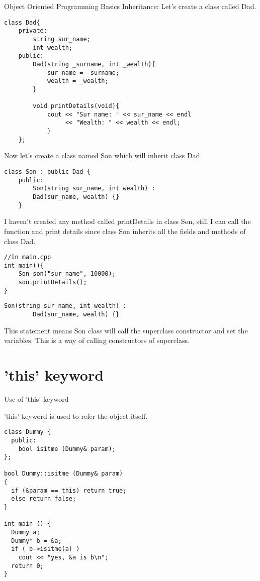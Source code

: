 \documentclass[newPxFont]{beamer}
\begin{document}
\begin{frame}{Object Oriented Programming Basics}
\alert{Inheritance:}
Let's create a class called Dad.

\begin{verbatim}
class Dad{
    private:
        string sur_name;
        int wealth;
    public:
        Dad(string _surname, int _wealth){
            sur_name = _surname;
            wealth = _wealth;
        }
        
        void printDetails(void){
            cout << "Sur name: " << sur_name << endl
                 << "Wealth: " << wealth << endl;
            }
    };
\end{verbatim}

Now let's create a class named Son which will inherit class Dad

\begin{verbatim}
class Son : public Dad {
    public:
        Son(string sur_name, int wealth) :
        Dad(sur_name, wealth) {}
    }
\end{verbatim}

I haven't created any method called \alert{printDetails} in class \alert{Son}, still I can call the function and print details since class Son inherits all the fields and methods of class Dad.

\begin{verbatim}
//In main.cpp
int main(){
    Son son("sur_name", 10000);
    son.printDetails();
}
\end{verbatim}

\vspace{16em}

\begin{verbatim}
Son(string sur_name, int wealth) :
        Dad(sur_name, wealth) {}
\end{verbatim}

This statement means \alert{Son} class will call the superclass constructor and set the variables. This is a way of calling constructors of superclass.

\end{frame}

\endgroup

\section{'this' keyword}

\begin{frame}{Use of 'this' keyword}

\alert{'this'} keyword is used to refer the object itself.

\begin{verbatim}
class Dummy {
  public:
    bool isitme (Dummy& param);
};

bool Dummy::isitme (Dummy& param)
{
  if (&param == this) return true;
  else return false;
}

int main () {
  Dummy a;
  Dummy* b = &a;
  if ( b->isitme(a) )
    cout << "yes, &a is b\n";
  return 0;
}
\end{verbatim}

\end{frame}
\end{document}

